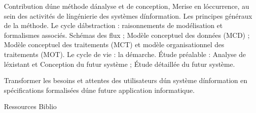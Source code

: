 \vfill

{
Contribution d\'une méthode d\'analyse et de conception, Merise en l\'occurrence, au sein des activités de l\'ingénierie des systèmes d\'information. Les principes généraux de la méthode. Le cycle d\'abstraction : raisonnements de modélisation et formalismes associés. Schémas des flux ; Modèle conceptuel des données (MCD) ; Modèle conceptuel des traitements (MCT) et modèle organisationnel des traitements (MOT). Le cycle de vie : la démarche. Étude préalable : Analyse de l\'existant et Conception du futur système ; Étude détaillée du futur système. 
} 
{} 
{\begin{itemize}
 \ObjItem Transformer les besoins et attentes des utilisateurs d\'un système d\'information en spécifications formalisées d\'une future application informatique.
\end{itemize} 
} 
{Ressources} 
{Biblio} 
 
\vfill

